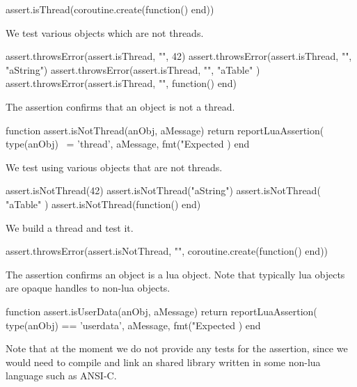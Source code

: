 \startLuaTest
  assert.isThread(coroutine.create(function() end))
\stopLuaTest
\stopTestCase


We test various objects which are not threads.

\startLuaTest
  assert.throwsError(assert.isThread, "", 42)
  assert.throwsError(assert.isThread, "", "aString")
  assert.throwsError(assert.isThread, "", { "aTable" })
  assert.throwsError(assert.isThread, "", function() end)
\stopLuaTest
\stopTestCase

\stopTestSuite


The  assertion confirms that an object is not a 
thread. 

\startLuaCode
function assert.isNotThread(anObj, aMessage)
  return reportLuaAssertion(
    type(anObj) ~= 'thread',
    aMessage,
    fmt("Expected %
  )
end
\stopLuaCode


We test using various objects that are not threads. 

\startLuaTest
  assert.isNotThread(42)
  assert.isNotThread("aString")
  assert.isNotThread({ "aTable" })
  assert.isNotThread(function() end)
\stopLuaTest
\stopTestCase


We build a thread and test it.

\startLuaTest
  assert.throwsError(assert.isNotThread, "",
    coroutine.create(function() end))
\stopLuaTest
\stopTestCase

\stopTestSuite


The  assertion confirms an object is a lua 
 object. Note that typically lua  objects 
are opaque handles to non-lua objects. 

\startLuaCode
function assert.isUserData(anObj, aMessage)
  return reportLuaAssertion(
    type(anObj) == 'userdata',
    aMessage,
    fmt("Expected %
  )
end
\stopLuaCode

Note that at the moment we do not provide any  tests for 
the  assertion, since we would need to compile and 
link an shared library written in some non-lua language such as ANSI-C. 

